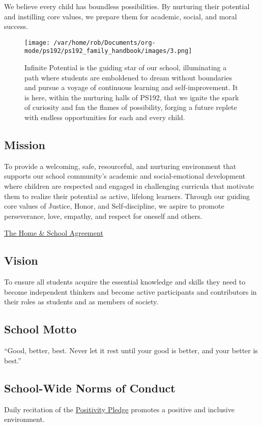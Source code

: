 \documentclass[letterpaper, 11pt]{article}
\begin{document}
We believe every child has boundless possibilities. By nurturing their potential and instilling core values, we prepare them for academic, social, and moral success.

\begin{figure}[htbp]
\centering
\texttt{[image: /var/home/rob/Documents/org-mode/ps192/ps192\_family\_handbook/images/3.png]}
\caption{Infinite Potential is the guiding star of our school, illuminating a path where students are emboldened to dream without boundaries and pursue a voyage of continuous learning and self-improvement. It is here, within the nurturing halls of PS192, that we ignite the spark of curiosity and fan the flames of possibility, forging a future replete with endless opportunities for each and every child.}
\end{figure}

\subsection{Mission}
\label{sec:orgdc3fd02}
To provide a welcoming, safe, resourceful, and nurturing environment that supports our school community's academic and social-emotional development where children are respected and engaged in challenging curricula that motivate them to realize their potential as active, lifelong learners. Through our guiding core values of Justice, Honor, and Self-discipline, we aspire to promote perseverance, love, empathy, and respect for oneself and others.

\href{https://4.files.edl.io/d109/09/17/23/012751-34dac161-8e19-4033-8c6b-f369007cab02.pdf}{The Home \& School Agreement}

\subsection{Vision}
\label{sec:orgc967963}
To ensure all students acquire the essential knowledge and skills they need to become independent thinkers and become active participants and contributors in their roles as students and as members of society.

\subsection{School Motto}
\label{sec:org99c5568}

``Good, better, best. Never let it rest until your good is better, and your better is best.''

\subsection{School-Wide Norms of Conduct}
\label{sec:org3827239}
Daily recitation of the \href{https://www.ps192.org/apps/pages/index.jsp?uREC\_ID=1504973\&type=d\&pREC\_ID=2371090}{Positivity Pledge} promotes a positive and inclusive environment.
\end{document}
